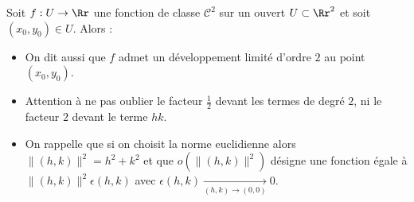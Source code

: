 \documentclass[11pt, class=report,crop=false]{standalone}
\begin{document}
\begin{theoreme}    
Soit $f:U \to \Rr$ une fonction de classe $\mathcal{C}^2$ sur un ouvert $U\subset \Rr^2$ et soit $(x_0,y_0)\in U$.  Alors :
   
\end{theoreme}


\begin{itemize}
    \item On dit aussi que $f$ admet un développement limité d'ordre $2$ au point $(x_0,y_0)$.

    \item Attention à ne pas oublier le facteur $\frac12$ devant les termes de degré $2$, ni le facteur $2$ devant le terme $hk$.
    
    \item On rappelle que si on choisit la norme euclidienne alors $\|(h,k)\|^2 = h^2+k^2$ et que $o\left(\|(h,k)\|^2\right)$ désigne une fonction égale à $\|(h,k)\|^2 \epsilon(h,k)$ avec $\epsilon(h,k) 
    \xrightarrow[(h,k)\to (0,0)]{} 0.$


\end{itemize}
\end{document}
